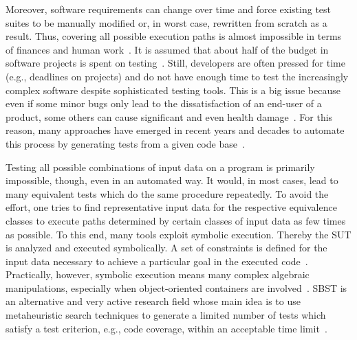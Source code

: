 \documentclass[paper=a4,%
  twoside,%
  BCOR4mm,%
  abstract=true,%
  toc=bibliography,%
  chapterprefix=true,%
  toc=bibliographynumbered,%
  open=right,%
  english,%
  pagesize=pdftex]{scrreprt}
\newcommand{\sut}{\ac{SUT}\xspace}
\begin{document}
Moreover, software requirements can change over time and force existing test suites to be manually modified or, in worst case, rewritten from scratch as a result. Thus, covering all possible execution paths is almost impossible in terms of finances and human work~\cite{Myers2012}. It is assumed that about half of the budget in software projects is spent on testing~\cite{Beizer2003}. Still, developers are often pressed for time (e.g., deadlines on projects) and do not have enough time to test the increasingly complex software despite sophisticated testing tools. This is a big issue because even if some minor bugs only lead to the dissatisfaction of an end-user of a product, some others can cause significant and even health damage~\cite{Myers2012}. For this reason, many approaches have emerged in recent years and decades to automate this process by generating tests from a given code base~\cite{McMinn_2004}.

Testing all possible combinations of input data on a program is primarily impossible, though, even in an automated way. It would, in most cases, lead to many equivalent tests which do the same procedure repeatedly. To avoid the effort, one tries to find representative input data for the respective equivalence classes to execute paths determined by certain classes of input data as few times as possible. To this end, many tools exploit symbolic execution. Thereby the \sut is analyzed and executed symbolically. A set of constraints is defined for the input data necessary to achieve a particular goal in the executed code~\cite{Clarke1976}. Practically, however, symbolic execution means many complex algebraic manipulations, especially when object-oriented containers are involved~\cite{Korel1990}. \ac{SBST} is an alternative and very active research field whose main idea is to use metaheuristic search techniques to generate a limited number of tests which satisfy a test criterion, e.g., code coverage, within an acceptable time limit~\cite{McMinn_2004}.
\end{document}
